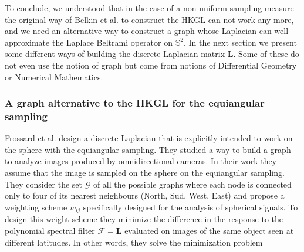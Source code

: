 To conclude, we understood that in the case of a non uniform sampling measure the original way of Belkin et al. \cite{Belkin:2005:TTF:2138147.2138189} to construct the HKGL can not work any more, and we need an alternative way to construct a graph whose Laplacian can well approximate the Laplace Beltrami operator on $\mathbb S^2$. In the next section we present some different ways of building the discrete Laplacian matrix $\mathbf L$. Some of these do not even use the notion of graph but come from notions of Differential Geometry or Numerical Mathematics.

\subsubsection{A graph alternative to the HKGL for the equiangular sampling}

Frossard et al. \cite{Frossard2017GraphBasedCO} design a discrete Laplacian that is explicitly intended to work on the sphere with the equiangular sampling. They studied a way to build a graph to analyze images produced by omnidirectional cameras. In their work they assume that the image is sampled on the sphere on the equiangular sampling. They consider the set $\mathcal G$ of all the possible graphs where each node is connected only to four of its nearest neighbours (North, Sud, West, East) and propose a weighting scheme $w_{ij}$ specifically designed for the analysis of spherical signals. To design this weight scheme they minimize the difference in the response to the polynomial spectral filter $\mathcal F = \mathbf L$ evaluated on images of the same object seen at different latitudes. In other words, they solve the minimization problem

